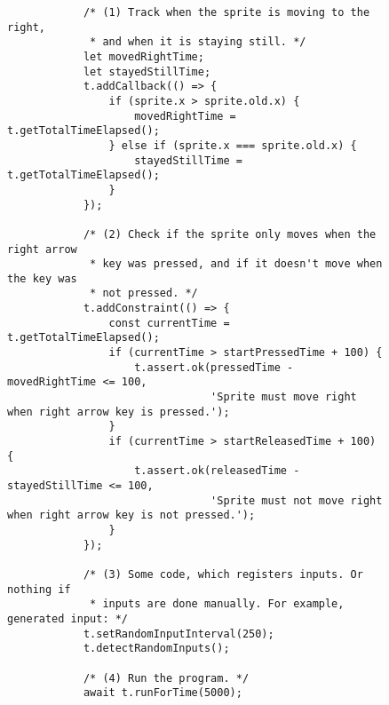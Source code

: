 \begin{listing}[ht]
\begin{subfigure}[b]{.55\textwidth}
\begin{verbatim}
            /* (1) Track when the sprite is moving to the right,
             * and when it is staying still. */
            let movedRightTime;
            let stayedStillTime;
            t.addCallback(() => {
                if (sprite.x > sprite.old.x) {
                    movedRightTime = t.getTotalTimeElapsed();
                } else if (sprite.x === sprite.old.x) {
                    stayedStillTime = t.getTotalTimeElapsed();
                }
            });

            /* (2) Check if the sprite only moves when the right arrow
             * key was pressed, and if it doesn't move when the key was
             * not pressed. */
            t.addConstraint(() => {
                const currentTime = t.getTotalTimeElapsed();
                if (currentTime > startPressedTime + 100) {
                    t.assert.ok(pressedTime - movedRightTime <= 100,
                                'Sprite must move right when right arrow key is pressed.');
                }
                if (currentTime > startReleasedTime + 100) {
                    t.assert.ok(releasedTime - stayedStillTime <= 100,
                                'Sprite must not move right when right arrow key is not pressed.');
                }
            });

            /* (3) Some code, which registers inputs. Or nothing if
             * inputs are done manually. For example, generated input: */
            t.setRandomInputInterval(250);
            t.detectRandomInputs();

            /* (4) Run the program. */
            await t.runForTime(5000);


\end{verbatim}
\end{subfigure}
\end{listing}
